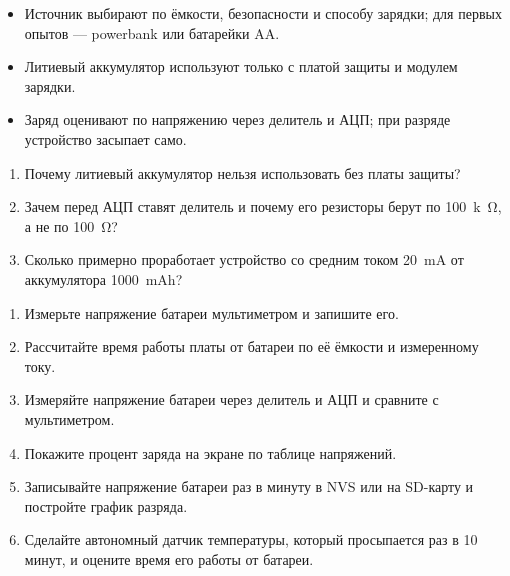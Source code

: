 \begin{summary}
\begin{itemize}[leftmargin=*]
  \item Источник выбирают по ёмкости, безопасности и способу зарядки; для первых опытов --- powerbank или батарейки AA.
  \item Литиевый аккумулятор используют только с платой защиты и модулем зарядки.
  \item Заряд оценивают по напряжению через делитель и АЦП; при разряде устройство засыпает само.
\end{itemize}
\end{summary}

\begin{selfcheck}
\begin{enumerate}
  \item Почему литиевый аккумулятор нельзя использовать без платы защиты?
  \item Зачем перед АЦП ставят делитель и почему его резисторы берут по \SI{100}{k\ohm}, а не по \SI{100}{\ohm}?
  \item Сколько примерно проработает устройство со средним током \SI{20}{mA} от аккумулятора \SI{1000}{mAh}?
\end{enumerate}
\end{selfcheck}

\begin{tasks}
\begin{enumerate}
\item {} Измерьте напряжение батареи мультиметром и запишите его.
\item {} Рассчитайте время работы платы от батареи по её ёмкости и измеренному току.
\item {} Измеряйте напряжение батареи через делитель и АЦП и сравните с мультиметром.
\item {} Покажите процент заряда на экране по таблице напряжений.
\item {} Записывайте напряжение батареи раз в минуту в NVS или на SD-карту и постройте график разряда.
\item {} Сделайте автономный датчик температуры, который просыпается раз в 10 минут, и оцените время его работы от батареи.
\end{enumerate}
\end{tasks}
